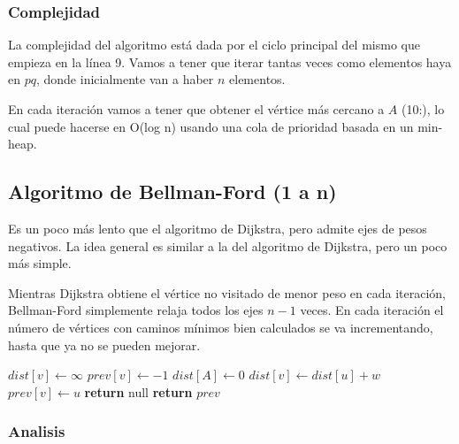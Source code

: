 \subsubsection*{Complejidad}

La complejidad del algoritmo est\'a dada por el ciclo principal del mismo que empieza en la l\'inea 9. Vamos a tener que iterar tantas veces como elementos haya en $pq$, donde inicialmente van a haber $n$ elementos.

En cada iteraci\'on vamos a tener que obtener el v\'ertice m\'as cercano a $A$ (10:), lo cual puede hacerse en O(log n) usando una cola de prioridad basada en un min-heap.


\newpage
\subsection{Algoritmo de Bellman-Ford (1 a n)}

Es un poco m\'as lento que el algoritmo de Dijkstra, pero admite ejes de pesos negativos. La idea general es similar a la del algoritmo de Dijkstra, pero un poco m\'as simple. 

Mientras Dijkstra obtiene el v\'ertice no visitado de menor peso en cada iteraci\'on, Bellman-Ford simplemente relaja todos los ejes $n-1$ veces. En cada iteraci\'on el n\'umero de v\'ertices con caminos m\'inimos bien calculados se va incrementando, hasta que ya no se pueden mejorar.

\begin{algorithm}
\begin{algorithmic}[1]
    \State $dist[v] \gets \infty$
    \State $prev[v] \gets -1$
  \EndFor
  \State $dist[A] \gets 0$
            \State $dist[v] \gets dist[u] + w$
            \State $prev[v] \gets u$
        \EndIf
    \EndFor
  \EndFor
    
        \State \textbf{return} null
    \EndIf
  \EndFor
  \State \textbf{return} $prev$
\EndFunction
\end{algorithmic}
\end{algorithm}

\subsubsection*{Analisis}

